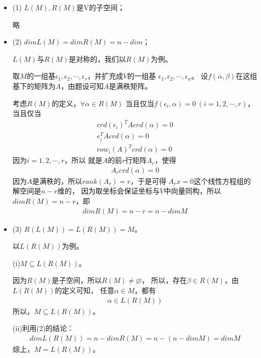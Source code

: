 \documentclass{article}
\begin{document}
\begin{itemize}
  \item (1) $L(M), R(M)$是V的子空间；

        略

  \item (2) $dim L(M) = dim R(M) = n - dim$；

        $L(M)$与$R(M)$是对称的，我们以$R(M)$为例。

        取$M$的一组基$\epsilon_1, \epsilon_2, \cdots, \epsilon_r$，并扩充成$V$的一组基
        $\epsilon_1, \epsilon_2, \cdots, \epsilon_n$。
        设$f(\alpha, \beta)$在这组基下的矩阵为$A$，由题设可知$A$是满秩矩阵。

        考虑$R(M)$的定义，$\forall \alpha \in R(M)$
        当且仅当$f(\epsilon_i, \alpha) = 0 \ (i = 1, 2, \cdots, r)$，
        当且仅当
        \begin{align*}
          crd(\epsilon_i)^T A crd(\alpha) = 0 \\
          e_i^T A crd(\alpha) = 0             \\
          row_i(A)^T crd(\alpha) = 0
        \end{align*}
        因为$i = 1, 2, \cdots, r$，所以
        就是$A$的前$r$行矩阵$A_r$，使得
        \begin{align*}
          A_r crd(\alpha) = 0
        \end{align*}
        因为$A$是满秩的，所以$rank(A_r) = r$，于是可得
        $A_r x = 0$这个线性方程组的解空间是$n - r$维的，
        因为取坐标会保证坐标与$V$中向量同构，所以$dim R(M) = n - r$，即
        \begin{align*}
          dim R(M) = n - r = n - dim M
        \end{align*}

  \item (3) $R(L(M)) = L(R(M)) = M$。

        以$L(R(M))$为例。

        (i)$M \subseteq L(R(M))$。

        因为$R(M)$是子空间，所以$R(M) \neq \varnothing$，
        所以，存在$\beta \in R(M)$，由$L(R(M))$的定义可知，
        任意$\alpha \in M$，都有
        \begin{align*}
          \alpha \in L(R(M))
        \end{align*}
        所以，$M \subseteq L(R(M))$。

        (ii)利用(2)的结论：
        \begin{align*}
          dim L(R(M)) = n - dim R(M) = n - (n - dim M) = dim M
        \end{align*}
        综上，$M = L(R(M))$。
\end{itemize}
\end{document}
